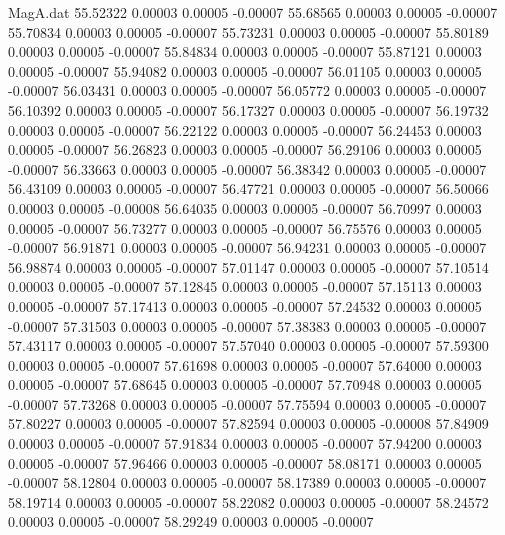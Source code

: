 \begin{filecontents}{MagA.dat}
  55.52322    0.00003    0.00005   -0.00007
  55.68565    0.00003    0.00005   -0.00007
  55.70834    0.00003    0.00005   -0.00007
  55.73231    0.00003    0.00005   -0.00007
  55.80189    0.00003    0.00005   -0.00007
  55.84834    0.00003    0.00005   -0.00007
  55.87121    0.00003    0.00005   -0.00007
  55.94082    0.00003    0.00005   -0.00007
  56.01105    0.00003    0.00005   -0.00007
  56.03431    0.00003    0.00005   -0.00007
  56.05772    0.00003    0.00005   -0.00007
  56.10392    0.00003    0.00005   -0.00007
  56.17327    0.00003    0.00005   -0.00007
  56.19732    0.00003    0.00005   -0.00007
  56.22122    0.00003    0.00005   -0.00007
  56.24453    0.00003    0.00005   -0.00007
  56.26823    0.00003    0.00005   -0.00007
  56.29106    0.00003    0.00005   -0.00007
  56.33663    0.00003    0.00005   -0.00007
  56.38342    0.00003    0.00005   -0.00007
  56.43109    0.00003    0.00005   -0.00007
  56.47721    0.00003    0.00005   -0.00007
  56.50066    0.00003    0.00005   -0.00008
  56.64035    0.00003    0.00005   -0.00007
  56.70997    0.00003    0.00005   -0.00007
  56.73277    0.00003    0.00005   -0.00007
  56.75576    0.00003    0.00005   -0.00007
  56.91871    0.00003    0.00005   -0.00007
  56.94231    0.00003    0.00005   -0.00007
  56.98874    0.00003    0.00005   -0.00007
  57.01147    0.00003    0.00005   -0.00007
  57.10514    0.00003    0.00005   -0.00007
  57.12845    0.00003    0.00005   -0.00007
  57.15113    0.00003    0.00005   -0.00007
  57.17413    0.00003    0.00005   -0.00007
  57.24532    0.00003    0.00005   -0.00007
  57.31503    0.00003    0.00005   -0.00007
  57.38383    0.00003    0.00005   -0.00007
  57.43117    0.00003    0.00005   -0.00007
  57.57040    0.00003    0.00005   -0.00007
  57.59300    0.00003    0.00005   -0.00007
  57.61698    0.00003    0.00005   -0.00007
  57.64000    0.00003    0.00005   -0.00007
  57.68645    0.00003    0.00005   -0.00007
  57.70948    0.00003    0.00005   -0.00007
  57.73268    0.00003    0.00005   -0.00007
  57.75594    0.00003    0.00005   -0.00007
  57.80227    0.00003    0.00005   -0.00007
  57.82594    0.00003    0.00005   -0.00008
  57.84909    0.00003    0.00005   -0.00007
  57.91834    0.00003    0.00005   -0.00007
  57.94200    0.00003    0.00005   -0.00007
  57.96466    0.00003    0.00005   -0.00007
  58.08171    0.00003    0.00005   -0.00007
  58.12804    0.00003    0.00005   -0.00007
  58.17389    0.00003    0.00005   -0.00007
  58.19714    0.00003    0.00005   -0.00007
  58.22082    0.00003    0.00005   -0.00007
  58.24572    0.00003    0.00005   -0.00007
  58.29249    0.00003    0.00005   -0.00007

\end{filecontents}
